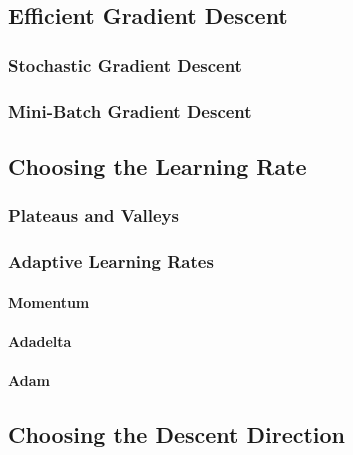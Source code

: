 		\subsection{Efficient Gradient Descent} %

			\subsubsection{Stochastic Gradient Descent} %

			\subsubsection{Mini-Batch Gradient Descent} %

		\subsection{Choosing the Learning Rate} %

			\subsubsection{Plateaus and Valleys} %

			\subsubsection{Adaptive Learning Rates} %

				\paragraph{Momentum} %

				\paragraph{Adadelta} %

				\paragraph{Adam} %

		\subsection{Choosing the Descent Direction} %

